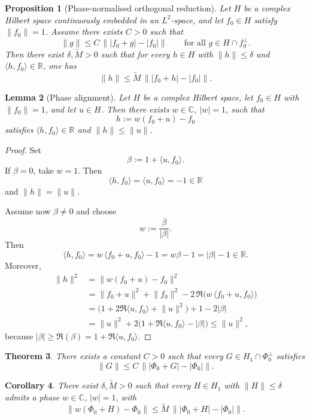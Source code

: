 \documentclass[11pt]{amsart}
\newtheorem{theorem}{Theorem}[section]
\newtheorem{proposition}[theorem]{Proposition}
\newtheorem{lemma}[theorem]{Lemma}
\newtheorem{corollary}[theorem]{Corollary}
\theoremstyle{remark}
\newcommand{\C}{\mathbb{C}}
\newcommand{\R}{\mathbb{R}}
\newcommand{\abs}[1]{\lvert #1 \rvert}
\newcommand{\norm}[1]{\lVert #1 \rVert}
\newcommand{\ip}[2]{\langle #1,#2\rangle}
\begin{document}
\begin{proposition}[Phase-normalised orthogonal reduction]\label{prop:orth-red}
Let $H$ be a complex Hilbert space continuously embedded in an $L^2$-space,
and let $f_0 \in H$ satisfy $\norm{f_0}=1$. Assume there exists $C>0$ such
that
\[
\norm{g}
\le
C\,\norm{\abs{f_0 + g} - \abs{f_0}}
\qquad
\text{for all } g \in H \cap f_0^\perp.
\]
Then there exist $\delta,\widetilde M>0$ such that for every $h \in H$ with
$\norm{h}\le\delta$ and $\ip{h}{f_0}\in\R$, one has
\[
\norm{h}
\le
\widetilde M\,\norm{\abs{f_0 + h} - \abs{f_0}}.
\]
\end{proposition}

\begin{lemma}[Phase alignment]\label{lem:phase-alignment}
Let $H$ be a complex Hilbert space, let $f_0 \in H$ with $\norm{f_0}=1$, and
let $u \in H$. Then there exists $w \in \C$, $\abs{w}=1$, such that
\[
h := w(f_0 + u) - f_0
\]
satisfies $\ip{h}{f_0} \in \R$ and $\norm{h} \le \norm{u}$.
\end{lemma}

\begin{proof}
Set
\[
\beta := 1 + \ip{u}{f_0}.
\]
If $\beta = 0$, take $w=1$. Then
\[
\ip{h}{f_0} = \ip{u}{f_0} = -1 \in \R
\]
and $\norm{h}=\norm{u}$.

Assume now $\beta \ne 0$ and choose
\[
w := \frac{\overline{\beta}}{\abs{\beta}}.
\]
Then
\[
\ip{h}{f_0}
=
w\,\ip{f_0 + u}{f_0} - 1
=
w\beta - 1
=
\abs{\beta} - 1
\in \R.
\]
Moreover,
\begin{align*}
\norm{h}^2
&=
\norm{w(f_0 + u) - f_0}^2 \\
&=
\norm{f_0 + u}^2 + \norm{f_0}^2 - 2\,\Re\!\bigl(w\,\ip{f_0 + u}{f_0}\bigr) \\
&=
\bigl(1 + 2\Re\ip{u}{f_0} + \norm{u}^2\bigr) + 1 - 2\abs{\beta} \\
&=
\norm{u}^2 + 2\bigl(1 + \Re\ip{u}{f_0} - \abs{\beta}\bigr)
\le
\norm{u}^2,
\end{align*}
because $\abs{\beta}\ge\Re(\beta)=1+\Re\ip{u}{f_0}$.
\end{proof}

\begin{theorem}\label{thm:main-orthog}
There exists a constant $C>0$ such that every
$G \in H_1 \cap \Phi_0^\perp$ satisfies
\[
\norm{G}
\le
C\,\norm{\abs{\Phi_0 + G} - \abs{\Phi_0}}.
\]
\end{theorem}

\begin{corollary}\label{cor:main-local}
There exist $\delta,\widetilde M>0$ such that every $H \in H_1$ with
$\norm{H}\le\delta$ admits a phase $w \in \C$, $\abs{w}=1$, with
\[
\norm{w(\Phi_0 + H) - \Phi_0}
\le
\widetilde M\,\norm{\abs{\Phi_0 + H} - \abs{\Phi_0}}.
\]
\end{corollary}
\end{document}
